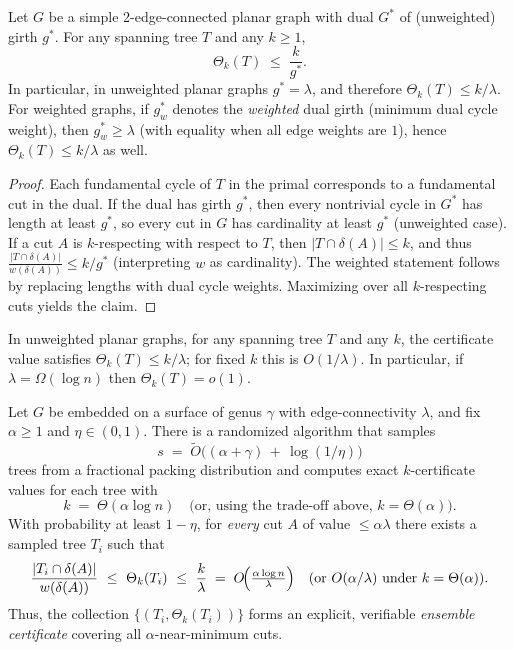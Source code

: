 \documentclass[11pt,letterpaper]{article}
\begin{document}
\begin{theorem}
\label{thm:dual-girth}
Let $G$ be a simple 2-edge-connected planar graph with dual $G^\ast$ of (unweighted) girth $g^\ast$.
For any spanning tree $T$ and any $k\ge 1$,
\[
  \Theta_k(T)\;\le\;\frac{k}{g^\ast}.
\]
In particular, in unweighted planar graphs $g^\ast=\lambda$, and therefore
$\Theta_k(T)\le k/\lambda$. For weighted graphs, if $g^\ast_w$ denotes the
\emph{weighted} dual girth (minimum dual cycle weight), then $g^\ast_w\ge \lambda$
(with equality when all edge weights are $1$), hence $\Theta_k(T)\le k/\lambda$ as well.
\end{theorem}

\begin{proof}
Each fundamental cycle of $T$ in the primal corresponds to a fundamental cut
in the dual. If the dual has girth $g^\ast$, then every nontrivial cycle in $G^\ast$
has length at least $g^\ast$, so every cut in $G$ has cardinality at least $g^\ast$
(unweighted case). If a cut $A$ is $k$-respecting with respect to $T$,
then $|T\cap\delta(A)| \le k$, and thus
$\frac{|T\cap\delta(A)|}{w(\delta(A))} \le k/g^\ast$ (interpreting $w$ as cardinality).
The weighted statement follows by replacing lengths with dual cycle weights.
Maximizing over all $k$-respecting cuts yields the claim.
\end{proof}

\begin{corollary}
\label{cor:planar-thin}
In unweighted planar graphs, for any spanning tree $T$ and any $k$,
the certificate value satisfies $\Theta_k(T)\le k/\lambda$; for fixed $k$
this is $O(1/\lambda)$. In particular, if $\lambda=\Omega(\log n)$
then $\Theta_k(T)=o(1)$.
\end{corollary}

\begin{theorem}
\label{thm:genus-thin}
Let $G$ be embedded on a surface of genus $\gamma$ with edge-connectivity $\lambda$,
and fix $\alpha\ge 1$ and $\eta\in(0,1)$.
There is a randomized algorithm that samples
\[
s \;=\; \tilde O\big((\alpha+\gamma)\,+\,\log(1/\eta)\big)
\]
trees from a fractional packing distribution and computes exact $k$-certificate
values for each tree with
\[
k \;=\; \Theta(\alpha\log n) \quad\text{(or, using the trade-off above, }k=\Theta(\alpha)\text{)}.
\]
With probability at least $1-\eta$, for \emph{every} cut $A$ of value $\le \alpha\lambda$
there exists a sampled tree $T_i$ such that
\[
\frac{|T_i\cap\delta(A)|}{w(\delta(A))}\ \le\ \Theta_k(T_i)\ \le\ \frac{k}{\lambda}
\;=\; O\!\Big(\tfrac{\alpha\log n}{\lambda}\Big)\quad\text{\rm(or }O(\alpha/\lambda)\text{ under }k=\Theta(\alpha)\text{)}.
\]
Thus, the collection $\{(T_i,\Theta_k(T_i))\}$ forms an explicit, verifiable
\emph{ensemble certificate} covering all $\alpha$-near-minimum cuts.
\end{theorem}
\end{document}
